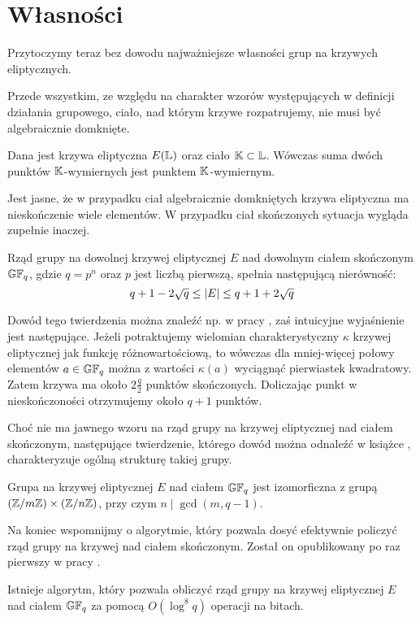 \section{Własności}

Przytoczymy teraz bez dowodu najważniejsze własności
grup na krzywych eliptycznych.

Przede wszystkim, ze względu na charakter wzorów występujących
w definicji działania grupowego,
ciało, nad którym krzywe rozpatrujemy, nie musi być algebraicznie domknięte.

\begin{fact}
Dana jest krzywa eliptyczna $E(\mathbb{L})$ oraz ciało $\mathbb{K} \subset \mathbb{L}$.
Wówczas suma dwóch punktów $\mathbb{K}$-wymiernych jest punktem $\mathbb{K}$-wymiernym.
\end{fact}

Jest jasne, że w przypadku ciał algebraicznie domkniętych krzywa eliptyczna
ma nieskończenie wiele elementów.
W przypadku ciał skończonych sytuacja wygląda zupełnie inaczej.

\begin{theorem}[Hasse]
Rząd grupy na dowolnej krzywej eliptycznej $E$
nad dowolnym ciałem skończonym $\mathbb{GF}_q$,
gdzie $q = p^n$ oraz $p$ jest liczbą pierwszą,
spełnia następującą nierówność:
\begin{equation}
q + 1 - 2\sqrt{q} \leq \lvert E\rvert \leq q + 1 + 2\sqrt{q}
\end{equation}
\end{theorem}

Dowód tego twierdzenia można znaleźć np. w pracy \cite{ecintro1},
zaś intuicyjne wyjaśnienie jest następujące.
Jeżeli potraktujemy wielomian charakterystyczny $\kappa$ krzywej eliptycznej
jak funkcję różnowartościową,
to wówczas dla mniej-więcej połowy elementów $a \in \mathbb{GF}_q$
można z wartości $\kappa(a)$ wyciągnąć pierwiastek kwadratowy.
Zatem krzywa ma około $2\frac{q}{2}$ punktów skończonych.
Doliczając punkt w nieskończoności otrzymujemy około $q + 1$ punktów.

Choć nie ma jawnego wzoru
na rząd grupy na krzywej eliptycznej nad ciałem skończonym,
następujące twierdzenie,
którego dowód można odnaleźć w książce \cite{silverman},
charakteryzuje ogólną strukturę takiej grupy.

\begin{theorem}
Grupa na krzywej eliptycznej $E$ nad ciałem $\mathbb{GF}_q$
jest izomorficzna z grupą $(\mathbb{Z}/m\mathbb{Z}) \times (\mathbb{Z}/n\mathbb{Z})$,
przy czym $n \mid \gcd(m, q-1)$.
\end{theorem}

Na koniec wspomnijmy o algorytmie,
który pozwala dosyć efektywnie policzyć
rząd grupy na krzywej nad ciałem skończonym.
Został on opublikowany po raz pierwszy w pracy \cite{schoof}.

\begin{theorem}[Schoof]
Istnieje algorytm, który pozwala obliczyć rząd grupy na krzywej eliptycznej $E$
nad ciałem $\mathbb{GF}_q$ za pomocą $O(\log^8 q)$ operacji na bitach.
\end{theorem}
